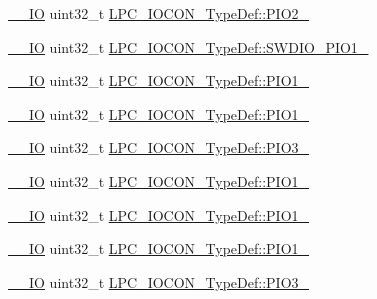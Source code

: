 \begin{DoxyCompactItemize}
\item 
\hyperlink{group___c_m_s_i_s__core__definitions_gaec43007d9998a0a0e01faede4133d6be}{\+\_\+\+\_\+\+IO} uint32\+\_\+t \hyperlink{group___l_p_c11xx___definitions_ga39ffc992bab7191884f1a926743ffdf5}{L\+P\+C\+\_\+\+I\+O\+C\+O\+N\+\_\+\+Type\+Def\+::\+P\+I\+O2\+\_}
\item 
\hyperlink{group___c_m_s_i_s__core__definitions_gaec43007d9998a0a0e01faede4133d6be}{\+\_\+\+\_\+\+IO} uint32\+\_\+t \hyperlink{group___l_p_c11xx___definitions_ga3ced73f257a78ae4b7de9a811ea4d248}{L\+P\+C\+\_\+\+I\+O\+C\+O\+N\+\_\+\+Type\+Def\+::\+S\+W\+D\+I\+O\+\_\+\+P\+I\+O1\+\_}
\item 
\hyperlink{group___c_m_s_i_s__core__definitions_gaec43007d9998a0a0e01faede4133d6be}{\+\_\+\+\_\+\+IO} uint32\+\_\+t \hyperlink{group___l_p_c11xx___definitions_ga37567f664f663d9a9704e567629fa77b}{L\+P\+C\+\_\+\+I\+O\+C\+O\+N\+\_\+\+Type\+Def\+::\+P\+I\+O1\+\_}
\item 
\hyperlink{group___c_m_s_i_s__core__definitions_gaec43007d9998a0a0e01faede4133d6be}{\+\_\+\+\_\+\+IO} uint32\+\_\+t \hyperlink{group___l_p_c11xx___definitions_ga4f916a71decccb5aac0af7249b098ac5}{L\+P\+C\+\_\+\+I\+O\+C\+O\+N\+\_\+\+Type\+Def\+::\+P\+I\+O1\+\_}
\item 
\hyperlink{group___c_m_s_i_s__core__definitions_gaec43007d9998a0a0e01faede4133d6be}{\+\_\+\+\_\+\+IO} uint32\+\_\+t \hyperlink{group___l_p_c11xx___definitions_ga55e0f9c076d146081bae89118a344894}{L\+P\+C\+\_\+\+I\+O\+C\+O\+N\+\_\+\+Type\+Def\+::\+P\+I\+O3\+\_}
\item 
\hyperlink{group___c_m_s_i_s__core__definitions_gaec43007d9998a0a0e01faede4133d6be}{\+\_\+\+\_\+\+IO} uint32\+\_\+t \hyperlink{group___l_p_c11xx___definitions_ga755707b6d35e6497cd10aeb38bee443c}{L\+P\+C\+\_\+\+I\+O\+C\+O\+N\+\_\+\+Type\+Def\+::\+P\+I\+O1\+\_}
\item 
\hyperlink{group___c_m_s_i_s__core__definitions_gaec43007d9998a0a0e01faede4133d6be}{\+\_\+\+\_\+\+IO} uint32\+\_\+t \hyperlink{group___l_p_c11xx___definitions_gab0d99b431267d587d8d31f11746ccfec}{L\+P\+C\+\_\+\+I\+O\+C\+O\+N\+\_\+\+Type\+Def\+::\+P\+I\+O1\+\_}
\item 
\hyperlink{group___c_m_s_i_s__core__definitions_gaec43007d9998a0a0e01faede4133d6be}{\+\_\+\+\_\+\+IO} uint32\+\_\+t \hyperlink{group___l_p_c11xx___definitions_gad81e4c8b31f2bd3420aefa571cfeb08c}{L\+P\+C\+\_\+\+I\+O\+C\+O\+N\+\_\+\+Type\+Def\+::\+P\+I\+O1\+\_}
\item 
\hyperlink{group___c_m_s_i_s__core__definitions_gaec43007d9998a0a0e01faede4133d6be}{\+\_\+\+\_\+\+IO} uint32\+\_\+t \hyperlink{group___l_p_c11xx___definitions_ga8297919bcdca8419b6f8347e76a042ef}{L\+P\+C\+\_\+\+I\+O\+C\+O\+N\+\_\+\+Type\+Def\+::\+P\+I\+O3\+\_}

\end{DoxyCompactItemize}
